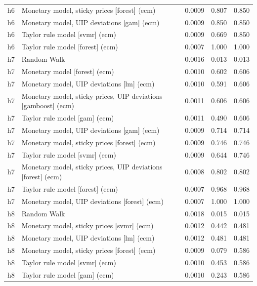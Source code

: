 \begin{ThreePartTable}
\begin{longtable}[t]{cp{5.5cm}ccc}
h6 & \raggedright Monetary model, sticky prices [forest] (ecm) & 0.0009 & 0.807 & 0.850\\
h6 & \raggedright Monetary model, UIP deviations [gam] (ecm) & 0.0009 & 0.850 & 0.850\\
h6 & \raggedright Taylor rule model [svmr] (ecm) & 0.0009 & 0.669 & 0.850\\
h6 & \raggedright Taylor rule model [forest] (ecm) & 0.0007 & 1.000 & 1.000\\
\addlinespace
h7 & \raggedright Random Walk & 0.0016 & 0.013 & 0.013\\
h7 & \raggedright Monetary model [forest] (ecm) & 0.0010 & 0.602 & 0.606\\
h7 & \raggedright Monetary model, UIP deviations [lm] (ecm) & 0.0010 & 0.591 & 0.606\\
h7 & \raggedright Monetary model, sticky prices, UIP deviations [gamboost] (ecm) & 0.0011 & 0.606 & 0.606\\
h7 & \raggedright Taylor rule model [gam] (ecm) & 0.0011 & 0.490 & 0.606\\
h7 & \raggedright Monetary model, UIP deviations [gam] (ecm) & 0.0009 & 0.714 & 0.714\\
h7 & \raggedright Monetary model, sticky prices [forest] (ecm) & 0.0009 & 0.746 & 0.746\\
h7 & \raggedright Taylor rule model [svmr] (ecm) & 0.0009 & 0.644 & 0.746\\
h7 & \raggedright Monetary model, sticky prices, UIP deviations [forest] (ecm) & 0.0008 & 0.802 & 0.802\\
h7 & \raggedright Taylor rule model [forest] (ecm) & 0.0007 & 0.968 & 0.968\\
h7 & \raggedright Monetary model, UIP deviations [forest] (ecm) & 0.0007 & 1.000 & 1.000\\
\addlinespace
h8 & \raggedright Random Walk & 0.0018 & 0.015 & 0.015\\
h8 & \raggedright Monetary model, sticky prices [svmr] (ecm) & 0.0012 & 0.442 & 0.481\\
h8 & \raggedright Monetary model, UIP deviations [lm] (ecm) & 0.0012 & 0.481 & 0.481\\
h8 & \raggedright Monetary model, sticky prices [forest] (ecm) & 0.0009 & 0.079 & 0.586\\
h8 & \raggedright Taylor rule model [svmr] (ecm) & 0.0010 & 0.453 & 0.586\\
h8 & \raggedright Taylor rule model [gam] (ecm) & 0.0010 & 0.243 & 0.586\\

\end{longtable}
\end{ThreePartTable}
